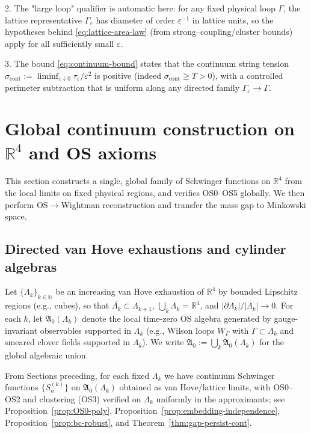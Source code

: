 \documentclass[11pt]{amsart}
\theoremstyle{plain}
\theoremstyle{definition}
\theoremstyle{remark}
\begin{document}
2. The "large loop" qualifier is automatic here: for any fixed physical loop $\Gamma$, the lattice representative $\Gamma_\varepsilon$ has diameter of order $\varepsilon^{-1}$ in lattice units, so the hypotheses behind \eqref{eq:lattice-area-law} (from strong--coupling/cluster bounds) apply for all sufficiently small $\varepsilon$.

3. The bound \eqref{eq:continuum-bound} states that the continuum string tension $\sigma_{\text{cont}}:=\liminf_{\varepsilon\downarrow 0}\tau_\varepsilon/\varepsilon^2$ is positive (indeed $\sigma_{\text{cont}}\ge T>0$), with a controlled perimeter subtraction that is uniform along any directed family $\Gamma_\varepsilon\to\Gamma$.

\section{Global continuum construction on $\mathbb R^4$ and OS axioms}\label{sec:global-R4}

This section constructs a single, global family of Schwinger functions on $\mathbb R^4$ from the local limits on fixed physical regions, and verifies OS0--OS5 globally. We then perform OS$\to$Wightman reconstruction and transfer the mass gap to Minkowski space.

\subsection{Directed van Hove exhaustions and cylinder algebras}

Let $\{\Lambda_k\}_{k\in\mathbb N}$ be an increasing van Hove exhaustion of $\mathbb R^4$ by bounded Lipschitz regions (e.g., cubes), so that $\overline{\Lambda_k}\subset\Lambda_{k+1}$, $\bigcup_k \Lambda_k=\mathbb R^4$, and $|\partial\Lambda_k|/|\Lambda_k|\to 0$. For each $k$, let $\mathfrak A_0(\Lambda_k)$ denote the local time-zero OS algebra generated by gauge-invariant observables supported in $\Lambda_k$ (e.g., Wilson loops $W_\Gamma$ with $\Gamma\subset\Lambda_k$ and smeared clover fields supported in $\Lambda_k$). We write $\mathfrak A_0:=\bigcup_k \mathfrak A_0(\Lambda_k)$ for the global algebraic union.

From Sections preceding, for each fixed $\Lambda_k$ we have continuum Schwinger functions $\{S^{(k)}_n\}$ on $\mathfrak A_0(\Lambda_k)$ obtained as van Hove/lattice limits, with OS0--OS2 and clustering (OS3) verified on $\Lambda_k$ uniformly in the approximants; see Proposition~\ref{prop:OS0-poly}, Proposition~\ref{prop:embedding-independence}, Proposition~\ref{prop:bc-robust}, and Theorem~\ref{thm:gap-persist-cont}.
\end{document}
